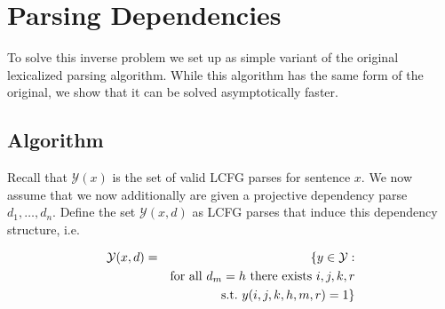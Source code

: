 \documentclass[11pt,letterpaper]{article}
\begin{document}


\section{Parsing Dependencies}

To solve this inverse problem we set up as
simple variant of the original lexicalized parsing algorithm. While this algorithm has the same form of the original, we show that it can be solved asymptotically faster.

\subsection{Algorithm}

Recall that $\mathcal{Y}(x)$ is the set of valid LCFG parses for sentence $x$. We now assume that we now additionally are given a projective dependency parse $d_1, \ldots, d_n$. Define the set $\mathcal{Y}(x,d)$ as LCFG parses that induce this dependency structure, i.e.

\begin{eqnarray*}
  {\cal Y}(x,d ) & =& \{ y \in {\cal Y}: \\
&&\mathrm{for\ all\ } d_m =  h \mathrm{ \ there\ exists\ } i, j, k, r \\
&&\mathrm{s.t. \ }  y (i, j, k, h, m, r) = 1   \}
\end{eqnarray*}












\end{document}
